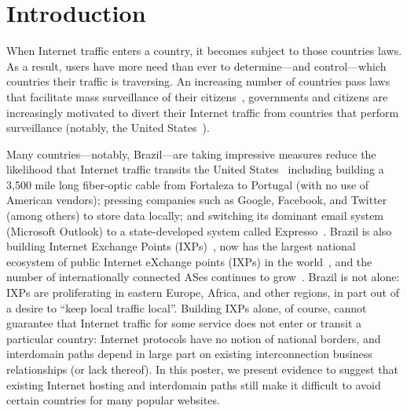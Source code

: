 \section{Introduction}

When Internet traffic enters a country, it becomes subject to those
countries laws.  As a result, users have more need than ever to
determine---and control---which countries their traffic is traversing.
An increasing number of countries pass laws that facilitate mass
surveillance of their citizens~\cite{france_surveillance,
  netherlands_surveillance, kazak_surveillance, uk_bill}, governments
and citizens are increasingly motivated to divert their Internet traffic
from countries that perform surveillance (notably, the United
States~\cite{russia_secure_internet, routing_errors, dte}).

Many countries---notably, Brazil---are taking impressive measures reduce
the likelihood that Internet traffic transits the United
States~\cite{brazil_history, brazil_break_from_US, brazil_conference,
  brazil_conference2, brazil_human_rights} including building a 3,500
mile long fiber-optic cable from Fortaleza to Portugal (with no use of
American vendors); pressing companies such as Google, Facebook, and
Twitter (among others) to store data locally; and switching its dominant
email system (Microsoft Outlook) to a state-developed system called
Expresso~\cite{brazil_cable, brazil_us_companies}.  Brazil is also
building Internet Exchange Points (IXPs)~\cite{brazil_IXP1}, now has the
largest national ecosystem of public Internet eXchange points (IXPs) in
the world~\cite{brazil_ixp_ecosystem}, and the number of internationally
connected ASes continues to
grow~\cite{brazil_international_ases}. Brazil is not alone: IXPs are
proliferating in eastern Europe, Africa, and other regions, in part out
of a desire to ``keep local traffic local''. Building IXPs alone, of
course, cannot guarantee that Internet traffic for some service does not
enter or transit a particular country: Internet protocols have no notion
of national borders, and interdomain paths depend in large part on
existing interconnection business relationships (or lack thereof).  In
this poster, we present evidence to suggest that existing Internet
hosting and interdomain paths still make it difficult to avoid certain
countries for many popular websites. 

